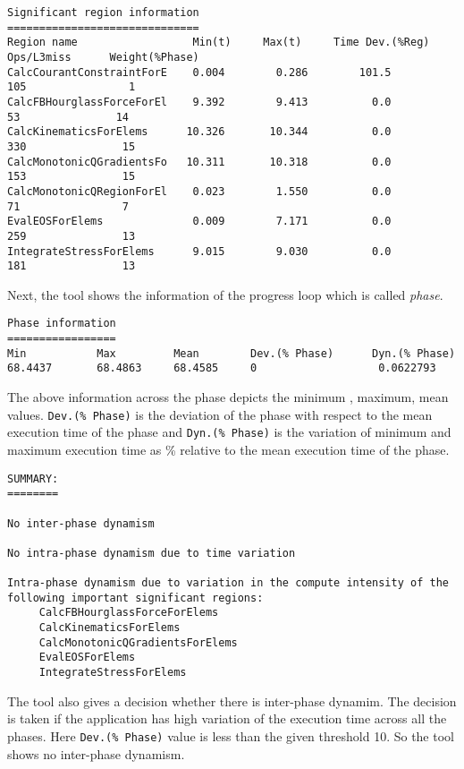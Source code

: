 \documentclass[12pt]{article}
\begin{document}
\begin{verbatim}
Significant region information
==============================
Region name                  Min(t)     Max(t)     Time Dev.(%Reg) Ops/L3miss      Weight(%Phase) 
CalcCourantConstraintForE    0.004        0.286        101.5           105                1 
CalcFBHourglassForceForEl    9.392        9.413          0.0            53               14 
CalcKinematicsForElems      10.326       10.344          0.0           330               15 
CalcMonotonicQGradientsFo   10.311       10.318          0.0           153               15 
CalcMonotonicQRegionForEl    0.023        1.550          0.0            71                7 
EvalEOSForElems              0.009        7.171          0.0           259               13 
IntegrateStressForElems      9.015        9.030          0.0           181               13 
\end{verbatim}

Next, the tool shows the information of the progress loop which is called \textit{phase}.

\begin{verbatim}
Phase information
=================
Min           Max         Mean        Dev.(% Phase)      Dyn.(% Phase)        
68.4437       68.4863     68.4585     0                   0.0622793       
\end{verbatim}  
The above information across the phase depicts the minimum , maximum, mean values. \texttt{Dev.(\% Phase)} is the deviation of the phase with respect to the mean execution time of the phase and \texttt{Dyn.(\% Phase)} is the variation of minimum and maximum execution time as \% relative to the mean execution time of the phase. 
\begin{verbatim}
SUMMARY:   
========

No inter-phase dynamism

No intra-phase dynamism due to time variation

Intra-phase dynamism due to variation in the compute intensity of the 
following important significant regions:
     CalcFBHourglassForceForElems 
     CalcKinematicsForElems    
     CalcMonotonicQGradientsForElems 
     EvalEOSForElems           
     IntegrateStressForElems   
\end{verbatim}

The tool also gives a decision whether there is inter-phase dynamim. The decision is taken if the application has high variation of the execution time across all the phases. Here \texttt{Dev.(\% Phase)} value is less than the given threshold 10. So the tool shows no inter-phase dynamism.
\end{document}
